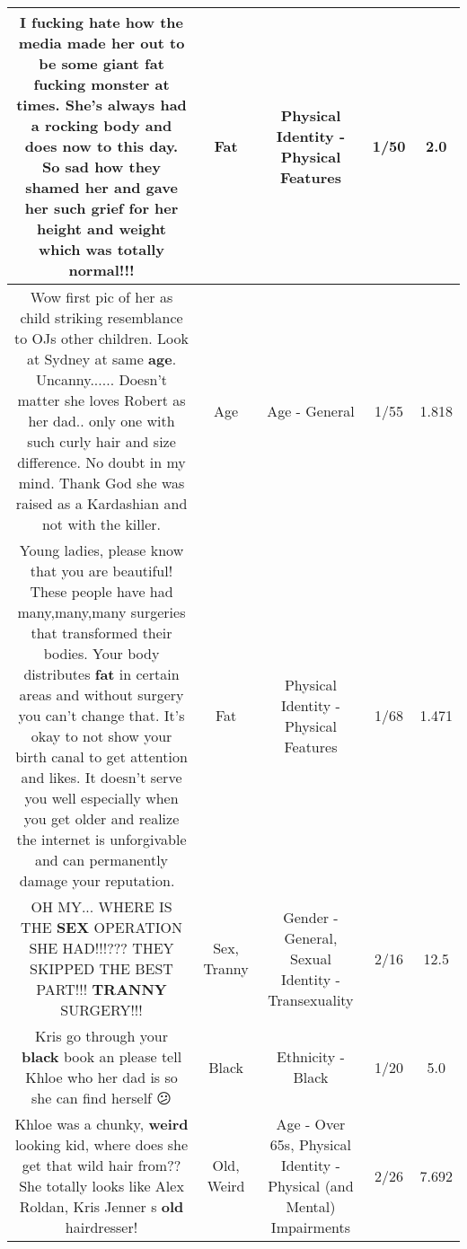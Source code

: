 \documentclass[11pt]{article}
\newlength\mylength
\begin{document}
\begin{center}
\begin{longtable}{|C{.65\mylength}|C{.30\mylength}|C{.12\mylength}|C{.12\mylength}|C{.12\mylength}|}
  \small I fucking hate how the media made her out to be some giant \textbf{fat} fucking monster at times. She's always had a rocking body and does now to this day. So sad how they shamed her and gave her such grief for her height and weight which was totally normal!!!\normalsize   & Fat & Physical Identity - Physical Features & 1/50 & 2.0 \\  \hline
  \small Wow first pic of her as child striking resemblance to OJs other children. Look at Sydney at same \textbf{age}. Uncanny...... Doesn't matter she loves Robert as her dad.. only one with such curly hair and size difference. No doubt in my mind. Thank God she was raised as a Kardashian and not with the killer.\normalsize   & Age & Age - General & 1/55 & 1.818 \\  \hline
  \small Young ladies, please know that you are beautiful! These people have had many,many,many surgeries that transformed their bodies. Your body distributes \textbf{fat} in certain areas and without surgery you can't change that. It's okay to not show your birth canal to get attention and likes. It doesn't serve you well especially when you get older and realize the internet is unforgivable and can permanently damage your reputation. 💜\normalsize   & Fat & Physical Identity - Physical Features & 1/68 & 1.471 \\  \hline
  \small OH MY... WHERE IS THE \textbf{SEX} OPERATION SHE HAD!!!??? THEY SKIPPED THE BEST PART!!!  \textbf{TRANNY} SURGERY!!!\normalsize   & Sex, Tranny & Gender - General, Sexual Identity - Transexuality & 2/16 & 12.5 \\  \hline
  \small Kris go through your \textbf{black} book an please tell Khloe who her dad is so she can find herself 😕\normalsize   & Black & Ethnicity - Black & 1/20 & 5.0 \\  \hline
  \small Khloe was a chunky, \textbf{weird} looking kid, where does she get that wild hair from?? She totally looks like Alex Roldan, Kris Jenner s \textbf{old} hairdresser!\normalsize   & Old, Weird & Age - Over 65s, Physical Identity - Physical (and Mental) Impairments & 2/26 & 7.692 \\  \hline

\end{longtable}
\end{center}
\end{document}
